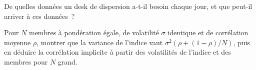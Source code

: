 \begin{interviewq}\label{iq:s2:dispersion-and-correlation:5}
De quelles données un desk de dispersion a-t-il besoin chaque jour, et que peut-il arriver à ces données~?
\end{interviewq}

\begin{interviewq}\label{iq:s2:dispersion-and-correlation:6}
Pour $N$ membres à pondération égale, de volatilité $\sigma$ identique et de corrélation moyenne $\rho$, montrer que la variance de l'indice vaut $\sigma^2(\rho + (1 -
\rho)/N)$, puis en déduire la corrélation implicite à partir des volatilités de l'indice et des membres pour $N$ grand.
\end{interviewq}
